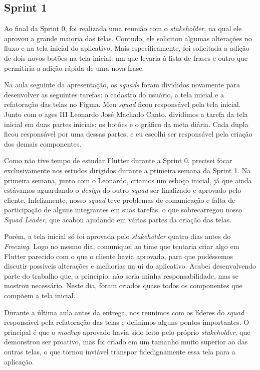 \subsection{Sprint 1}

Ao final da Sprint 0, foi realizada uma reunião com o \textit{stakeholder}, na qual ele aprovou a grande maioria das telas. Contudo, ele solicitou algumas alterações no fluxo e na tela inicial do aplicativo. Mais especificamente, foi solicitada a adição de dois novos botões na tela inicial: um que levaria à lista de frases e outro que permitiria a adição rápida de uma nova frase.

Na aula seguinte da apresentação, os \textit{squads} foram divididos novamente para desenvolver as seguintes tarefas: o cadastro do usuário, a tela inicial e a refatoração das telas no Figma. Meu \textit{squad} ficou responsável pela tela inicial. Junto com o \ac{ages} III Leonardo José Machado Canto, dividimos a tarefa da tela inicial em duas partes iniciais: os botões e o gráfico da meta diária. Cada dupla ficou responsável por uma dessas partes, e eu escolhi ser responsável pela criação dos demais componentes.

Como não tive tempo de estudar Flutter durante a Sprint 0, precisei focar exclusivamente nos estudos dirigidos durante a primeira semana da Sprint 1. Na primeira semana, junto com o Leonardo, criamos um esboço inicial, já que ainda estávamos aguardando o \textit{design} do outro \textit{squad} ser finalizado e aprovado pelo cliente. Infelizmente, nosso \textit{squad} teve problemas de comunicação e falta de participação de alguns integrantes em suas tarefas, o que sobrecarregou nosso \textit{Squad Leader}, que acabou ajudando em várias partes da criação das telas.

Porém, a tela inicial só foi aprovada pelo \textit{stakeholder} quatro dias antes do \textit{Freezing}. Logo no mesmo dia, comuniquei ao time que tentaria criar algo em Flutter parecido com o que o cliente havia aprovado, para que pudéssemos discutir possíveis alterações e melhorias na \ac{ui} do aplicativo. Acabei desenvolvendo parte do trabalho que, a princípio, não seria minha responsabilidade, mas se mostrou necessário. Neste dia, foram criados quase todos os componentes que compõem a tela inicial.

Durante a última aula antes da entrega, nos reunimos com os líderes do \textit{squad} responsável pela refatoração das telas e definimos alguns pontos importantes. O principal é que o \textit{mockup} aprovado havia sido feito pelo próprio \textit{stakeholder}, que demonstrou ser proativo, mas foi criado em um tamanho muito superior ao das outras telas, o que tornou inviável transpor fidedignamente essa tela para a aplicação.

